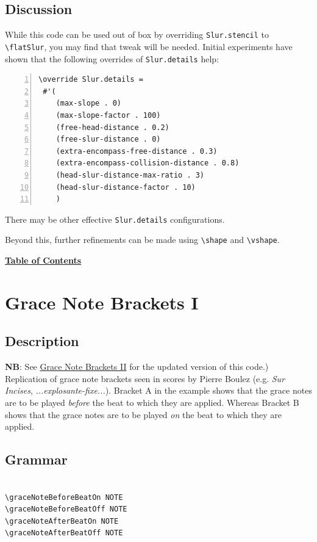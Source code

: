 \subsection{Discussion}
\label{sec:flat_slurs_discussion}
While this code can be used out of box by overriding \verb|Slur.stencil| to \verb|\flatSlur|, you may find that tweak will be needed. Initial experiments have shown that the following overrides of \verb|Slur.details| help:
\begin{Verbatim}[numbers=left,xleftmargin=5mm]
 \override Slur.details =
 #'(
    (max-slope . 0)
    (max-slope-factor . 100)
    (free-head-distance . 0.2)
    (free-slur-distance . 0)
    (extra-encompass-free-distance . 0.3)
    (extra-encompass-collision-distance . 0.8)
    (head-slur-distance-max-ratio . 3)
    (head-slur-distance-factor . 10)
    )
\end{Verbatim}

There may be other effective \verb|Slur.details| configurations.

Beyond this, further refinements can be made using \verb|\shape| and \verb|\vshape|.

\hyperref[sec:toc]{\textbf{Table of Contents}}

\vfill \break





\section {Grace Note Brackets I}
\hfill
{}
\hfill

\subsection{Description}
\textbf{NB}: See \hyperref[sec:gracenote2]{Grace Note Brackets II} for the updated version of this code.)
Replication of grace note brackets seen in scores by Pierre Boulez (e.g. \textit{Sur Incises}\autocite{RN1738}, \textit{...explosante-fixe...}\autocite{RN1737}). Bracket A in the example shows that the grace notes are to be played \textit{before} the beat to which they are applied. Whereas Bracket B shows that the grace notes are to be played \textit{on} the beat to which they are applied.

\subsection{Grammar}
\begin{verbatim}

\graceNoteBeforeBeatOn NOTE
\graceNoteBeforeBeatOff NOTE
\graceNoteAfterBeatOn NOTE
\graceNoteAfterBeatOff NOTE

\end{verbatim}

